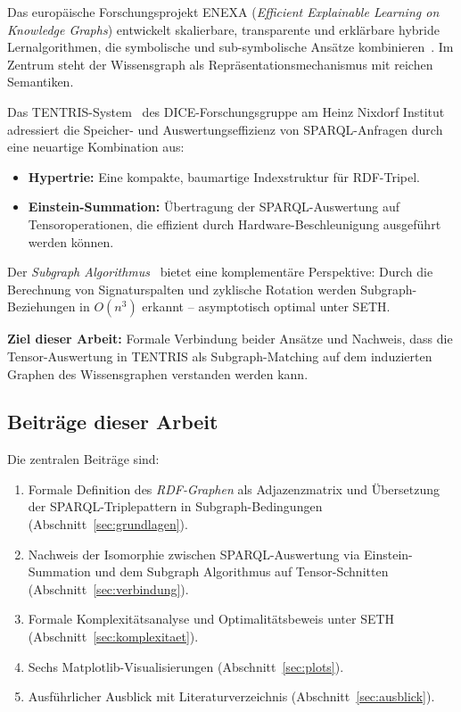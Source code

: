 ﻿\documentclass[a4paper,12pt]{article}
\theoremstyle{definition}
\begin{document}
Das europäische Forschungsprojekt ENEXA (\emph{Efficient Explainable Learning on Knowledge
Graphs}) entwickelt skalierbare, transparente und erklärbare hybride Lernalgorithmen, die
symbolische und sub-symbolische Ansätze kombinieren~\cite{enexa2023}. Im Zentrum steht der
Wissensgraph als Repräsentationsmechanismus mit reichen Semantiken.

Das TENTRIS-System~\cite{tentris2020} des DICE-Forschungsgruppe am Heinz Nixdorf Institut
adressiert die Speicher- und Auswertungseffizienz von SPARQL-Anfragen durch eine neuartige
Kombination aus:
\begin{itemize}
  \item \textbf{Hypertrie:} Eine kompakte, baumartige Indexstruktur für RDF-Tripel.
  \item \textbf{Einstein-Summation:} Übertragung der SPARQL-Auswertung auf Tensoroperationen,
        die effizient durch Hardware-Beschleunigung ausgeführt werden können.
\end{itemize}

Der \emph{Subgraph Algorithmus}~\cite{epp2026subgraph} bietet eine komplementäre
Perspektive: Durch die Berechnung von Signaturspalten und zyklische Rotation werden
Subgraph-Beziehungen in $O(n^3)$ erkannt -- asymptotisch optimal unter SETH.

\textbf{Ziel dieser Arbeit:} Formale Verbindung beider Ansätze und Nachweis, dass die
Tensor-Auswertung in TENTRIS als Subgraph-Matching auf dem induzierten Graphen des
Wissensgraphen verstanden werden kann.

\subsection{Beiträge dieser Arbeit}

Die zentralen Beiträge sind:
\begin{enumerate}
  \item Formale Definition des \emph{RDF-Graphen} als Adjazenzmatrix und Übersetzung der
        SPARQL-Triplepattern in Subgraph-Bedingungen (Abschnitt~\ref{sec:grundlagen}).
  \item Nachweis der Isomorphie zwischen SPARQL-Auswertung via Einstein-Summation und dem
        Subgraph Algorithmus auf Tensor-Schnitten (Abschnitt~\ref{sec:verbindung}).
  \item Formale Komplexitätsanalyse und Optimalitätsbeweis unter SETH
        (Abschnitt~\ref{sec:komplexitaet}).
  \item Sechs Matplotlib-Visualisierungen (Abschnitt~\ref{sec:plots}).
  \item Ausführlicher Ausblick mit Literaturverzeichnis (Abschnitt~\ref{sec:ausblick}).
\end{enumerate}
\end{document}
